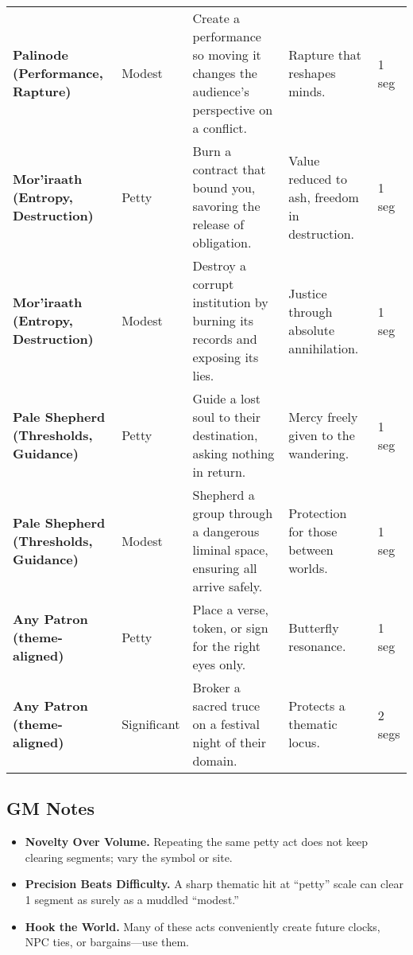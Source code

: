 \begin{table}[h]
\begin{tabularx}{\linewidth}{>{\bfseries}l l X X l}
  Palinode (Performance, Rapture) & Modest & Create a performance so moving it changes the audience's perspective on a conflict. & Rapture that reshapes minds. & 1 seg \\
  Mor'iraath (Entropy, Destruction) & Petty & Burn a contract that bound you, savoring the release of obligation. & Value reduced to ash, freedom in destruction. & 1 seg \\
  Mor'iraath (Entropy, Destruction) & Modest & Destroy a corrupt institution by burning its records and exposing its lies. & Justice through absolute annihilation. & 1 seg \\
  Pale Shepherd (Thresholds, Guidance) & Petty & Guide a lost soul to their destination, asking nothing in return. & Mercy freely given to the wandering. & 1 seg \\
  Pale Shepherd (Thresholds, Guidance) & Modest & Shepherd a group through a dangerous liminal space, ensuring all arrive safely. & Protection for those between worlds. & 1 seg \\
  Any Patron (theme-aligned) & Petty & Place a verse, token, or sign for the right eyes only. & Butterfly resonance. & 1 seg \\
  Any Patron (theme-aligned) & Significant & Broker a sacred truce on a festival night of their domain. & Protects a thematic locus. & 2 segs \\
  \bottomrule
  \end{tabularx}
  \end{table}
  

\subsection*{GM Notes}\label{subsec:acts-service-gm}
\begin{itemize}
\item \textbf{Novelty Over Volume.} Repeating the same petty act does not keep clearing segments; vary the symbol or site.
\item \textbf{Precision Beats Difficulty.} A sharp thematic hit at ``petty'' scale can clear 1 segment as surely as a muddled ``modest.''
\item \textbf{Hook the World.} Many of these acts conveniently create future clocks, NPC ties, or bargains---use them.
\end{itemize}

